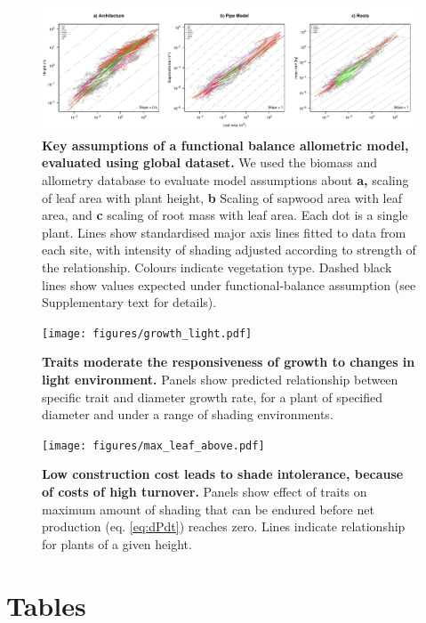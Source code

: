 \documentclass[12pt, a4paper]{article}
\makeatletter
\def\maxwidth{\ifdim\Gin@nat@width>\linewidth\linewidth
\else\Gin@nat@width\fi}
\let\Oldincludegraphics\includegraphics
\renewcommand{\includegraphics}[1]{\Oldincludegraphics[width=\maxwidth]{#1}}
\makeatother
\begin{document}
\begin{figure}[htbp]
\centering
\includegraphics{figs/allometry.pdf}
\caption{\textbf{Key assumptions of a functional balance allometric
model, evaluated using global dataset.} We used the biomass and
allometry database to evaluate model assumptions about \textbf{a,}
scaling of leaf area with plant height, \textbf{b} Scaling of sapwood
area with leaf area, and \textbf{c} scaling of root mass with leaf area.
Each dot is a single plant. Lines show standardised major axis lines
fitted to data from each site, with intensity of shading adjusted
according to strength of the relationship. Colours indicate vegetation
type. Dashed black lines show values expected under functional-balance
assumption (see Supplementary text for details). \label{f-assumptions}}
\end{figure}

\newpage

\begin{figure}[htbp]
\centering
\texttt{[image: figures/growth\_light.pdf]}
\caption{\textbf{Traits moderate the responsiveness of growth to changes
in light environment.} Panels show predicted relationship between
specific trait and diameter growth rate, for a plant of specified
diameter and under a range of shading environments.
\label{f-growth_light}}
\end{figure}

\newpage

\begin{figure}[htbp]
\centering
\texttt{[image: figures/max\_leaf\_above.pdf]}
\caption{\textbf{Low construction cost leads to shade intolerance,
because of costs of high turnover.} Panels show effect of traits on
maximum amount of shading that can be endured before net production (eq.
\ref{eq:dPdt}) reaches zero. Lines indicate relationship for plants of a
given height. \label{f-wplcp}}
\end{figure}

\newpage

\section{Tables}\label{tables}
\end{document}

